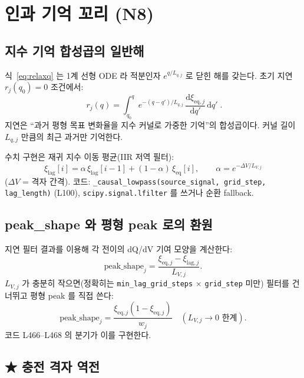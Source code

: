 \documentclass[11pt,a4paper]{article}
\newcommand{\dd}{\mathrm{d}}
\newcommand{\eq}{\mathrm{eq}}
\begin{document}
\section{인과 기억 꼬리 (N8)}\label{sec:tail}

\subsection{지수 기억 합성곱의 일반해}

식~\eqref{eq:relaxq} 는 1계 선형 ODE 라 적분인자 $e^{q/L_{q,j}}$ 로 닫힌 해를
갖는다. 초기 지연 $r_j(q_0)=0$ 조건에서:
\begin{equation}
\boxed{\;r_j(q) = \int_{q_0}^q e^{-(q-q')/L_{q,j}}\,\frac{\dd\xi_{\eq,j}}{\dd q'}\,\dd q'\;.}
\label{eq:memory}
\end{equation}
지연은 ``과거 평형 목표 변화율을 지수 커널로 가중한 기억''의 합성곱이다.
커널 길이 $L_{q,j}$ 만큼의 최근 과거만 기억한다.

수치 구현은 재귀 지수 이동 평균(IIR 저역 필터):
\begin{equation}
\xi_\mathrm{lag}[i] = \alpha\,\xi_\mathrm{lag}[i-1] + (1-\alpha)\,\xi_\eq[i],\qquad
\alpha = e^{-\Delta V/L_{V,j}}
\label{eq:iir}
\end{equation}
($\Delta V$ = 격자 간격). 코드: \texttt{\_causal\_lowpass(source\_signal, grid\_step, lag\_length)} (L100),
\texttt{scipy.signal.lfilter} 를 쓰거나 순환 fallback.

\subsection{peak\_shape 와 평형 peak 로의 환원}

지연 필터 결과를 이용해 각 전이의 dQ/dV 기여 모양을 계산한다:
\begin{equation}
\text{peak\_shape}_j = \frac{\xi_{\eq,j} - \xi_{\mathrm{lag},j}}{L_{V,j}}.
\label{eq:peakshape}
\end{equation}
$L_{V,j}$ 가 충분히 작으면(정확히는 \texttt{min\_lag\_grid\_steps} $\times$ \texttt{grid\_step}
미만) 필터를 건너뛰고 평형 peak 를 직접 쓴다:
\begin{equation}
\text{peak\_shape}_j = \frac{\xi_{\eq,j}(1-\xi_{\eq,j})}{w_j}\quad (L_{V,j} \to 0 \text{ 한계}).
\label{eq:eqrecover}
\end{equation}
코드 L466--L468 의 분기가 이를 구현한다.

\subsection{★ 충전 격자 역전}
\end{document}

